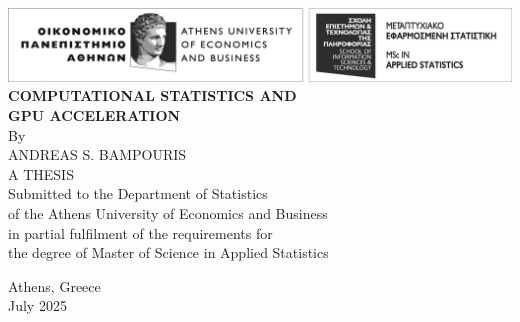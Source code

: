
\pagestyle{empty}


\begin{titlepage}
    \centering

    \includegraphics[width=\textwidth]{img/aueb_applied_statistics.jpg} \\[3cm]

    {\fontsize{18}{22}\selectfont
    \bfseries
    COMPUTATIONAL STATISTICS AND\\[0.15cm]
    GPU ACCELERATION} \\[2.5cm]

    \normalsize
    By \\[0.5cm]
    {\fontsize{18}{22}\selectfont
    ANDREAS S. BAMPOURIS} \\[3cm]

    \normalsize
    A THESIS \\[1cm]
    Submitted to the Department of Statistics \\[0.25cm]
    of the Athens University of Economics and Business \\[0.25cm]
    in partial fulfilment of the requirements for \\[0.25cm]
    the degree of Master of Science in Applied Statistics

    \vfill

    Athens, Greece \\
    July 2025
\end{titlepage}
\newpage

\mbox{}
\newpage

